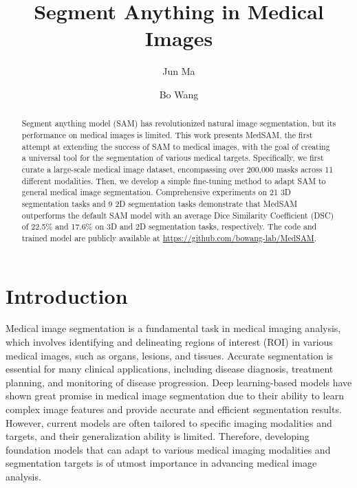 \documentclass[runningheads]{llncs}
\begin{document}
%
\title{Segment Anything in Medical Images}
%
%
\author{Jun Ma \and
Bo Wang%
}
%
%
\maketitle              %
%
\begin{abstract}
Segment anything model (SAM) has revolutionized natural image segmentation, but its performance on medical images is limited. 
This work presents MedSAM, the first attempt at  extending the success of SAM to medical images, with the goal of creating a universal tool for the segmentation of various medical targets. 
Specifically, we first curate a large-scale medical image dataset, encompassing over 200,000 masks across 11 different modalities. Then, we develop a simple fine-tuning method to adapt SAM to general medical image segmentation. Comprehensive experiments on 21 3D segmentation tasks and 9 2D segmentation tasks demonstrate that MedSAM outperforms the default SAM model with an average Dice Similarity Coefficient (DSC) of 22.5\% and 17.6\% on 3D and 2D segmentation tasks, respectively.
The code and trained model are publicly available at \url{https://github.com/bowang-lab/MedSAM}.
\end{abstract}



\section{Introduction}
Medical image segmentation is a fundamental task in medical imaging analysis, which involves identifying and delineating regions of interest (ROI) in various medical images, such as organs, lesions, and tissues. Accurate segmentation is essential for many clinical applications, including disease diagnosis, treatment planning, and monitoring of disease progression. Deep learning-based models have shown great promise in medical image segmentation due to their ability to learn complex image features and provide accurate and efficient segmentation results. However, current models are often tailored to specific imaging modalities and targets, and their generalization ability is limited. Therefore, developing foundation models that can adapt to various medical imaging modalities and segmentation targets is of utmost importance in advancing medical image analysis.
\end{document}
